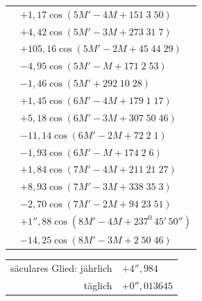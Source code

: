 \begin{longtable}{@{}r@{}l@{}}
&\(+1{,}17\cos(5M'-4M+151\;3\;50)\)\\
&\(+4{,}42\cos(5M'-3M+273\;31\;7)\)\\
&\(+105{,}16\cos(5M'-2M+45\;44\;29)\)\\
&\(-4{,}95\cos(5M'-M+171\;2\;53)\)\\
&\(-1{,}46\cos(5M'+292\;10\;28)\)\\
&\(+1{,}45\cos(6M'-4M+179\;1\;17)\)\\
&\(+5{,}18\cos(6M'-3M+307\;50\;46)\)\\
&\(-11{,}14\cos(6M'-2M+72\;2\;1)\)\\
&\(-1{,}93\cos(6M'-M+174\;2\;6)\)\\
&\(+1{,}84\cos(7M'-4M+211\;21\;27)\)\\
&\(+8{,}93\cos(7M'-3M+338\;35\;3)\)\\
&\(-2{,}70\cos(7M'-2M+94\;23\;51)\)\\
&\(+1''{,}88\cos(8M'-4M+237^0\,45'\,50'')\)\\
&\(-14{,}25\cos(8M'-3M+2\;50\;46)\)
\end{longtable}
\begin{center}
\begin{tabular}{rl}
säculares Glied: jährlich&\(+4''{,}984\)\\
täglich&\(+0''{,}013645\)
\end{tabular}
\end{center}
